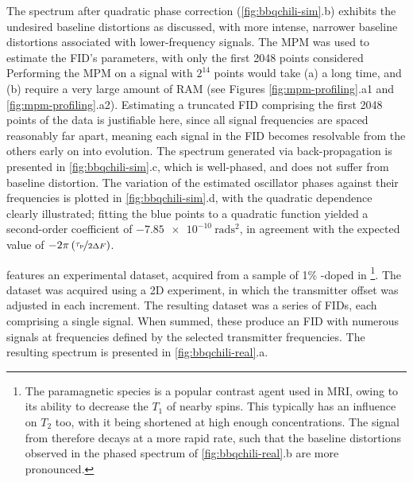The spectrum after quadratic phase correction (\cref{fig:bbqchili-sim}.b)
exhibits the undesired baseline distortions as discussed, with more intense,
narrower baseline distortions associated with lower-frequency signals.
The \ac{MPM} was used to estimate the \ac{FID}'s parameters,
with only the first 2048 points considered
Performing the \ac{MPM} on a signal with $2^{14}$ points would take (a) a
long time, and (b) require a very large amount of \ac{RAM} (see Figures
\ref{fig:mpm-profiling}.a1 and \ref{fig:mpm-profiling}.a2).
Estimating a truncated \ac{FID} comprising the first 2048 points of the
data is justifiable here, since all signal frequencies are spaced
reasonably far apart, meaning each signal in the \ac{FID} becomes
resolvable from the others early on into evolution.
The spectrum generated via back-propagation is presented in
\cref{fig:bbqchili-sim}.c, which is well-phased, and does not suffer from
baseline distortion. The variation of the estimated oscillator
phases against their frequencies is plotted in \cref{fig:bbqchili-sim}.d, with
the quadratic dependence clearly illustrated; fitting the blue points to a
quadratic function yielded a second-order coefficient of
$\qty{-7.85e-10}{\radian\second\squared}$, in agreement with the expected value
of $-2 \pi \left(\nicefrac{\tau_{\text{p}}}{2 \Updelta F}\right)$.

 features an experimental dataset, acquired
from a sample of 1\% -doped  in \footnote{
    The paramagnetic species  is a popular
    contrast agent used in \ac{MRI}, owing to its ability to decrease the $T_1$
    of nearby spins. This typically has an influence on $T_2$ too, with it
    being shortened at high enough concentrations.
    The signal from  therefore decays at a more rapid rate, such that
    the baseline distortions observed in the phased spectrum of
    \cref{fig:bbqchili-real}.b are more pronounced.
}.
The dataset was acquired using a \ac{2D} experiment, in which the transmitter
offset was adjusted in each increment. The resulting dataset was a series of
\acp{FID}, each comprising a single  signal.
When summed, these produce an \ac{FID} with numerous signals at frequencies
defined by the selected transmitter frequencies. The resulting spectrum is
presented in \cref{fig:bbqchili-real}.a.

